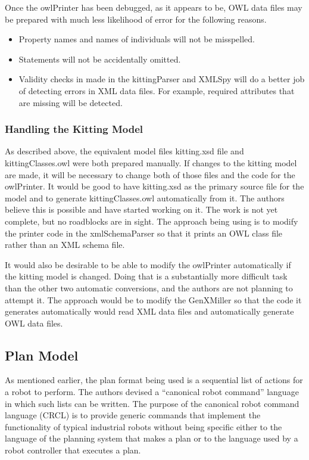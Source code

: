 Once the owlPrinter has been debugged, as it appears to be, OWL data files
may be prepared with much less likelihood of error for the following
reasons.
\begin{itemize}

\item Property names and names of individuals will not be misspelled.

\item Statements will not be accidentally omitted.

\item Validity checks in made in the kittingParser and XMLSpy will do a
  better job of detecting errors in XML data files. For example, required
  attributes that are missing will be detected.

\end{itemize}

\subsubsection{Handling the Kitting Model}

As described above, the equivalent model files kitting.xsd file and
kittingClasses.owl were both prepared manually. If changes to the kitting
model are made, it will be necessary to change both of those files and the
code for the owlPrinter. It would be good to have kitting.xsd as the
primary source file for the model and to generate kittingClasses.owl
automatically from it. The authors believe this is possible and have
started working on it. The work is not yet complete, but no roadblocks are
in sight. The approach being using is to modify the printer code in the
xmlSchemaParser so that it prints an OWL class file rather than an XML
schema file.

It would also be desirable to be able to modify the owlPrinter
automatically if the kitting model is changed. Doing that is a
substantially more difficult task than the other two automatic conversions,
and the authors are not planning to attempt it. The approach would be to
modify the GenXMiller so that the code it generates automatically would
read XML data files and automatically generate OWL data files.


\subsection{Plan Model}

As mentioned earlier, the plan format being used is a sequential list of
actions for a robot to perform. The authors devised a ``canonical robot
command'' language in which such lists can be written. The purpose of the
canonical robot command language (CRCL) is to provide generic commands that
implement the functionality of typical industrial robots without being
specific either to the language of the planning system that makes a plan or
to the language used by a robot controller that executes a plan.

